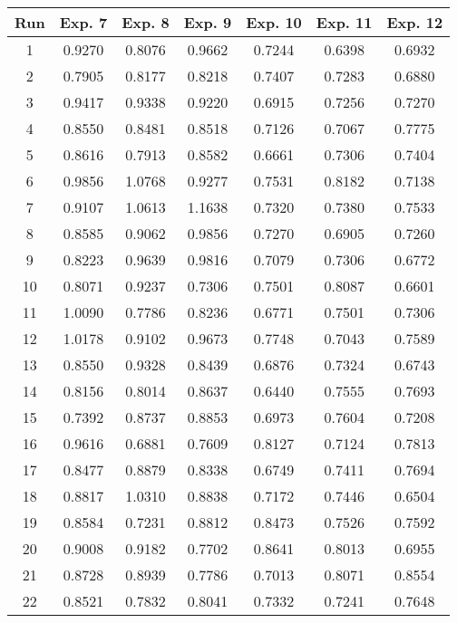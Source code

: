 \begin{table}
	\centering
	\begin{tabular}{ | c | c | c | c | c | c | c | }
		\hline
		Run & Exp. 7 & Exp. 8 & Exp. 9 & Exp. 10 & Exp. 11 & Exp. 12 \\ \hline
		1 & 0.9270 & 0.8076 & 0.9662 & 0.7244 & 0.6398 & 0.6932 \\ \hline
		2 & 0.7905 & 0.8177 & 0.8218 & 0.7407 & 0.7283 & 0.6880 \\ \hline
		3 & 0.9417 & 0.9338 & 0.9220 & 0.6915 & 0.7256 & 0.7270 \\ \hline
		4 & 0.8550 & 0.8481 & 0.8518 & 0.7126 & 0.7067 & 0.7775 \\ \hline
		5 & 0.8616 & 0.7913 & 0.8582 & 0.6661 & 0.7306 & 0.7404 \\ \hline
		6 & 0.9856 & 1.0768 & 0.9277 & 0.7531 & 0.8182 & 0.7138 \\ \hline
		7 & 0.9107 & 1.0613 & 1.1638 & 0.7320 & 0.7380 & 0.7533 \\ \hline
		8 & 0.8585 & 0.9062 & 0.9856 & 0.7270 & 0.6905 & 0.7260 \\ \hline
		9 & 0.8223 & 0.9639 & 0.9816 & 0.7079 & 0.7306 & 0.6772 \\ \hline
		10 & 0.8071 & 0.9237 & 0.7306 & 0.7501 & 0.8087 & 0.6601 \\ \hline
		11 & 1.0090 & 0.7786 & 0.8236 & 0.6771 & 0.7501 & 0.7306 \\ \hline
		12 & 1.0178 & 0.9102 & 0.9673 & 0.7748 & 0.7043 & 0.7589 \\ \hline
		13 & 0.8550 & 0.9328 & 0.8439 & 0.6876 & 0.7324 & 0.6743 \\ \hline
		14 & 0.8156 & 0.8014 & 0.8637 & 0.6440 & 0.7555 & 0.7693 \\ \hline
		15 & 0.7392 & 0.8737 & 0.8853 & 0.6973 & 0.7604 & 0.7208 \\ \hline
		16 & 0.9616 & 0.6881 & 0.7609 & 0.8127 & 0.7124 & 0.7813 \\ \hline
		17 & 0.8477 & 0.8879 & 0.8338 & 0.6749 & 0.7411 & 0.7694 \\ \hline
		18 & 0.8817 & 1.0310 & 0.8838 & 0.7172 & 0.7446 & 0.6504 \\ \hline
		19 & 0.8584 & 0.7231 & 0.8812 & 0.8473 & 0.7526 & 0.7592 \\ \hline
		20 & 0.9008 & 0.9182 & 0.7702 & 0.8641 & 0.8013 & 0.6955 \\ \hline
		21 & 0.8728 & 0.8939 & 0.7786 & 0.7013 & 0.8071 & 0.8554 \\ \hline
		22 & 0.8521 & 0.7832 & 0.8041 & 0.7332 & 0.7241 & 0.7648 \\ \hline

\end{tabular}
\end{table}
